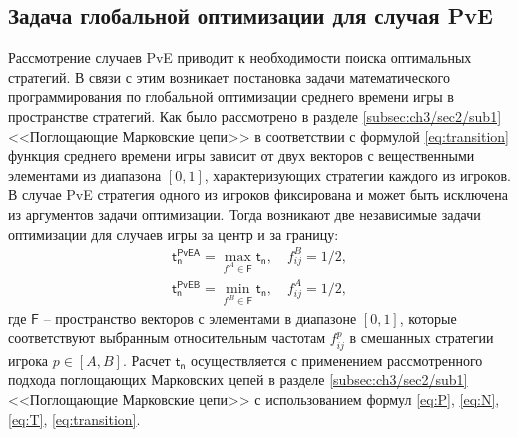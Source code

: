 \subsection{Задача глобальной оптимизации для случая PvE}\label{subsec:ch3/sec3/sub2}

Рассмотрение случаев PvE приводит к необходимости поиска оптимальных стратегий. В связи с этим возникает постановка задачи математического программирования по глобальной оптимизации среднего времени игры в пространстве стратегий. Как было рассмотрено в разделе \cref{subsec:ch3/sec2/sub1} <<Поглощающие Марковские цепи>> в соответствии с формулой \eqref{eq:transition} функция среднего времени игры зависит от двух векторов с вещественными элементами из диапазона $[0, 1]$, характеризующих стратегии каждого из игроков. В случае PvE стратегия одного из игроков фиксирована и может быть исключена из аргументов задачи оптимизации. Тогда возникают две независимые задачи оптимизации для случаев игры за центр и за границу:
\begin{equation}
    \begin{aligned}
        \boldsymbol{\mathsf{t_n^{PvEA}}} = \max_{f^A \in \boldsymbol{\mathsf{F}}} \boldsymbol{\mathsf{t_n}}, \hspace{1em} f_{ij}^B=1/2,
    \label{eq:centeropt}
    \end{aligned}
\end{equation}
\begin{equation}
    \begin{aligned}
        \boldsymbol{\mathsf{t_n^{PvEB}}} = \min_{f^B \in \boldsymbol{\mathsf{F}}} \boldsymbol{\mathsf{t_n}}, \hspace{1em}  f_{ij}^A=1/2,
    \label{eq:borderopt}
    \end{aligned}
\end{equation}
где $\boldsymbol{\mathsf{F}}$ -- пространство векторов с элементами в диапазоне $[0, 1]$, которые соответствуют выбранным относительным частотам $f_{ij}^p$ в смешанных стратегии игрока $p \in [A, B]$. Расчет $\boldsymbol{\mathsf{t_n}}$ осуществляется с применением рассмотренного подхода поглощающих Марковских цепей в разделе \cref{subsec:ch3/sec2/sub1} <<Поглощающие Марковские цепи>> с использованием формул \eqref{eq:P}, \eqref{eq:N}, \eqref{eq:T}, \eqref{eq:transition}.

